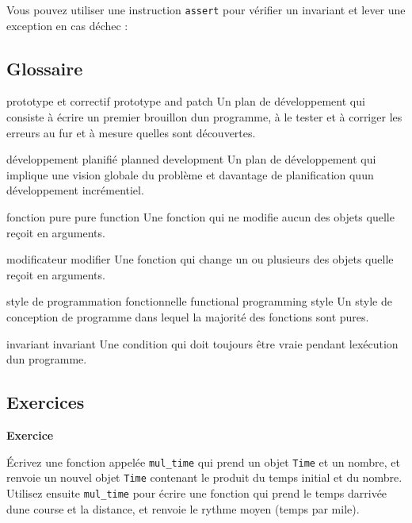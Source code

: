 Vous pouvez utiliser une instruction \texttt{assert} pour vérifier un
invariant et lever une exception en cas d\textquotesingle échec :

\begin{Shaded}
\begin{Highlighting}[]
\OperatorTok{=}\OperatorTok{+}
\end{Highlighting}
\end{Shaded}

\hypertarget{glossaire}{%
\subsection{Glossaire}\label{glossaire}}

prototype et correctif prototype and patch Un plan de développement qui
consiste à écrire un premier brouillon d\textquotesingle un programme, à
le tester et à corriger les erreurs au fur et à mesure
qu\textquotesingle elles sont découvertes.

développement planifié planned development Un plan de développement qui
implique une vision globale du problème et davantage de planification
qu\textquotesingle un développement incrémentiel.

fonction pure pure function Une fonction qui ne modifie aucun des objets
qu\textquotesingle elle reçoit en arguments.

modificateur modifier Une fonction qui change un ou plusieurs des objets
qu\textquotesingle elle reçoit en arguments.

style de programmation fonctionnelle functional programming style Un
style de conception de programme dans lequel la majorité des fonctions
sont pures.

invariant invariant Une condition qui doit toujours être vraie pendant
l\textquotesingle exécution d\textquotesingle un programme.

\hypertarget{exercices}{%
\subsection{Exercices}\label{exercices}}

\textbf{Exercice}

Écrivez une fonction appelée \texttt{mul\_time} qui prend un objet
\texttt{Time} et un nombre, et renvoie un nouvel objet \texttt{Time}
contenant le produit du temps initial et du nombre. Utilisez ensuite
\texttt{mul\_time} pour écrire une fonction qui prend le temps
d\textquotesingle arrivée d\textquotesingle une course et la distance,
et renvoie le rythme moyen (temps par mile).

